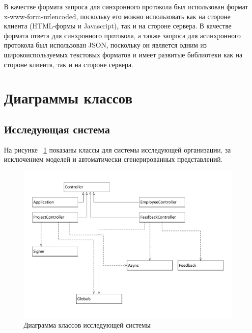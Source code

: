 В качестве формата запроса для синхронного протокола был использован формат x-www-form-urlencoded, поскольку его можно использовать как на стороне клиента (HTML-формы и Javascript), так и на стороне сервера.
В качестве формата ответа для синхронного протокола, а также запроса для асинхронного протокола был использован JSON, поскольку он является одним из широкоиспользуемых текстовых форматов и имеет развитые библиотеки как на стороне клиента, так и на стороне сервера.

\section{Диаграммы классов}

\subsection{Исследующая система}
На рисунке ~\ref{fig:class-survey} показаны классы для системы исследующей организации, за исключением моделей и автоматически сгенерированных представлений.
\begin{figure}[ht]
  \centering
  \includegraphics[width=\textwidth]{include/class-survey.pdf}
  \caption{Диаграмма классов исследующей системы}
  \label{fig:class-survey}
\end{figure}


